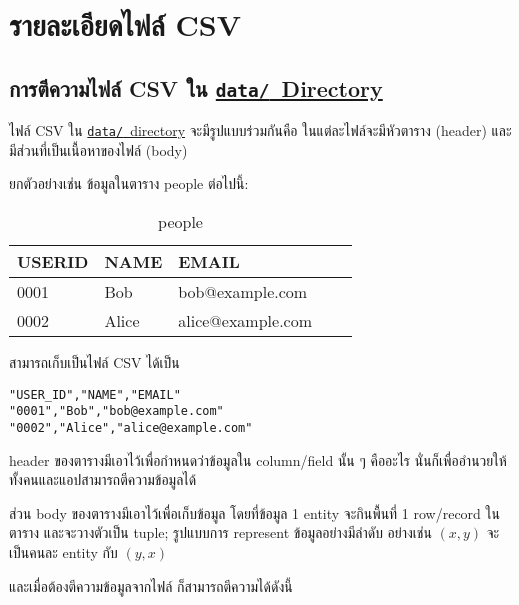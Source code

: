 \section{รายละเอียดไฟล์ CSV}

\subsection{การตีความไฟล์ CSV ใน \href{https://github.com/CS211-651/project211-oakcoding/tree/9397d355461933fb007261e2ee97445ea93eacc1/data}{\texttt{data\slash}~Directory}}

ไฟล์ CSV ใน \href{https://github.com/CS211-651/project211-oakcoding/tree/9397d355461933fb007261e2ee97445ea93eacc1/data}{\texttt{data\slash}~directory} จะมีรูปแบบร่วมกันคือ
ในแต่ละไฟล์จะมีหัวตาราง (header) และมีส่วนที่เป็นเนื้อหาของไฟล์ (body)

ยกตัวอย่างเช่น ข้อมูลในตาราง people ต่อไปนี้:

\begin{table}[!htb]
\begin{tabular}{@{} | l | l | l | l | l | @{}}
\hline
USER\textunderscore{}ID     & NAME       & EMAIL\\
\hline\hline
0001        & Bob        & bob@example.com\\
0002        & Alice      & alice@example.com\\
\hline
\end{tabular}
\caption{people}\label{tab:people}
\end{table}

สามารถเก็บเป็นไฟล์ CSV ได้เป็น

\begin{lstlisting}[caption={\texttt{people.csv}},label={lst:people.csv}]
"USER_ID","NAME","EMAIL"
"0001","Bob","bob@example.com"
"0002","Alice","alice@example.com"
\end{lstlisting}

header ของตารางมีเอาไว้เพื่อกำหนดว่าข้อมูลใน column/field นั้น ๆ คืออะไร
นั่นก็เพื่ออำนวยให้ทั้งคนและแอปสามารถตีความข้อมูลได้

ส่วน body ของตารางมีเอาไว้เพื่อเก็บข้อมูล โดยที่ข้อมูล 1 entity จะกินพื้นที่ 1 row/record ในตาราง
และจะวางตัวเป็น tuple; รูปแบบการ represent ข้อมูลอย่างมีลำดับ อย่างเช่น $ (x, y) $ จะเป็นคนละ entity กับ $ (y, x) $

และเมื่อต้องตีความข้อมูลจากไฟล์  ก็สามารถตีความได้ดังนี้

